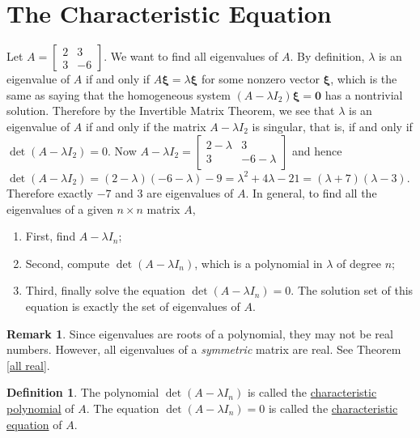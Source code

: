 \documentclass[12pt,letterpaper]{book}
\numberwithin{equation}{section}
\theoremstyle{definition}
\newtheorem{defi}[thm]{\textbf{Definition}}
\newtheorem{remark}[thm]{\textbf{Remark}}
\newcommand{\vxi}{\bm{\xi}}
\newcommand{\veczero}{\bm{0}}
\begin{document}
\section{The Characteristic Equation}

Let $A=\left[\begin{array}{rr} 2 & 3 \\ 3 & -6 \end{array}\right]$. We want to find all eigenvalues of
$A$. By definition, $\lambda$ is an eigenvalue of $A$ if and only if
$A\vxi=\lambda\vxi$ for some nonzero vector $\vxi$, which is the same
as saying that the homogeneous system $(A-\lambda I_2)\vxi=\veczero$
has a nontrivial solution. Therefore by the Invertible Matrix
Theorem, we see that $\lambda$ is an eigenvalue of $A$ if and only
if the matrix $A-\lambda I_2$ is singular, that
is, if and only if $\det (A-\lambda I_2)=0$. Now $A-\lambda I_2=\left[\begin{array}{cc} 2-\lambda & 3 \\
3 & -6-\lambda \end{array}\right]$ and hence $\det (A-\lambda
I_2)=(2-\lambda)(-6-\lambda)-9=\lambda^2+4\lambda-21=(\lambda+7)(\lambda-3)$.
Therefore exactly $-7$ and $3$ are eigenvalues of $A$. In general, to find all the eigenvalues of a given $n\times n$
matrix $A$,
\begin{enumerate}
\item First, find $A-\lambda I_n$;
\item Second, compute $\det (A-\lambda I_n)$, which is a polynomial
in $\lambda$ of degree $n$;
\item Third, finally solve the equation $\det (A-\lambda I_n)=0$. The
solution set of this equation is exactly the set of eigenvalues of
$A$.
\end{enumerate}

\begin{remark}
Since eigenvalues are roots of a polynomial, they may not be real numbers. However, all eigenvalues of a \textit{symmetric} matrix are real. See Theorem \ref{all real}.
\end{remark}

\begin{defi} The polynomial $\det (A-\lambda I_n)$ is called
the \underline{characteristic polynomial} of $A$. The equation $\det
(A-\lambda I_n)=0$ is called the
\underline{characteristic equation} of $A$.
\end{defi}
\end{document}
